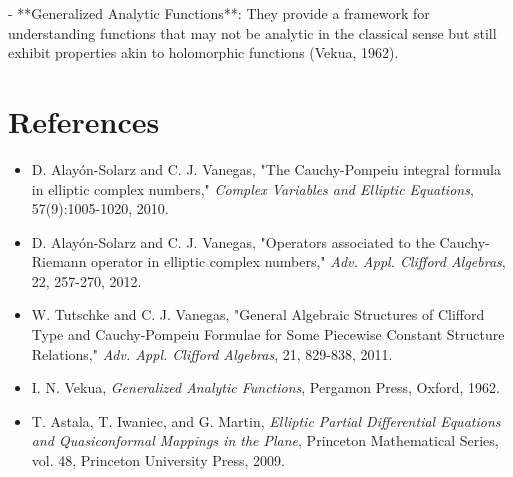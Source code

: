 \documentclass[11pt,a4paper]{article}
\begin{document}
- **Generalized Analytic Functions**: They provide a framework for understanding functions that may not be analytic in the classical sense but still exhibit properties akin to holomorphic functions (Vekua, 1962).

\section{References}
\begin{itemize}
    \item D. Alayón-Solarz and C. J. Vanegas, "The Cauchy-Pompeiu integral formula in elliptic complex numbers," \textit{Complex Variables and Elliptic Equations}, 57(9):1005-1020, 2010.
    \item D. Alayón-Solarz and C. J. Vanegas, "Operators associated to the Cauchy-Riemann operator in elliptic complex numbers," \textit{Adv. Appl. Clifford Algebras}, 22, 257-270, 2012.
    \item W. Tutschke and C. J. Vanegas, "General Algebraic Structures of Clifford Type and Cauchy-Pompeiu Formulae for Some Piecewise Constant Structure Relations," \textit{Adv. Appl. Clifford Algebras}, 21, 829-838, 2011.
    \item I. N. Vekua, \textit{Generalized Analytic Functions}, Pergamon Press, Oxford, 1962.
    \item T. Astala, T. Iwaniec, and G. Martin, \textit{Elliptic Partial Differential Equations and Quasiconformal Mappings in the Plane}, Princeton Mathematical Series, vol. 48, Princeton University Press, 2009.
\end{itemize}
\end{document}
